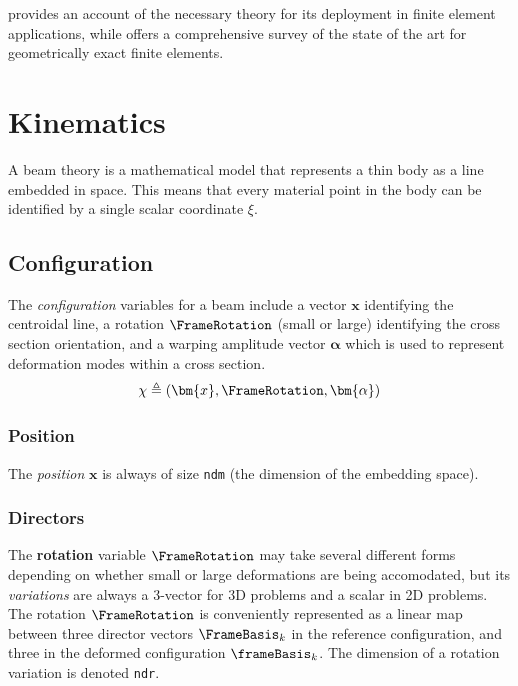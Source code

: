 \cite{zienkiewicz2014finite} provides an account of the
necessary theory for its deployment in finite element applications,
while \cite{meier2019geometrically} offers a comprehensive survey of the 
state of the art for geometrically exact finite elements.


\section{Kinematics}


A beam theory is a mathematical model that represents a thin body as a
line embedded in space. This means that every material point in the body
can be identified by a single scalar coordinate \(\xi\).

\subsection{Configuration}

The \emph{configuration} variables for a beam include a vector
  \(\bm{x}\) identifying the centroidal line, a rotation
  \(\FrameRotation\) (small or large) identifying the cross section
  orientation, and a warping amplitude vector
  \(\bm{\alpha}\) which is used to represent deformation modes within a
  cross section.
  \[
  \chi \triangleq \left(\bm{x}, \FrameRotation, \bm{\alpha}\right)
  \]

\subsubsection{Position}

The \emph{position} \(\bm{x}\) is always of size \texttt{ndm} (the dimension of the embedding space).

\subsubsection{Directors}
The \textbf{rotation} variable \(\FrameRotation\) may take several different forms depending on whether small or large deformations are being accomodated, but its \emph{variations} are always a 3-vector for 3D problems and a scalar in 2D problems. 
The rotation \(\FrameRotation\) is conveniently represented as a linear map between
    three director vectors \(\FrameBasis_k\) in the reference
    configuration, and three in the deformed configuration
    \(\frameBasis_k\). The dimension of a rotation variation is denoted
    \texttt{ndr}.

